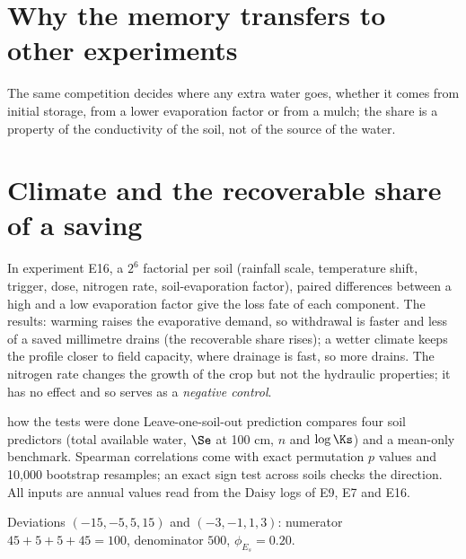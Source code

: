 


\section{Why the memory transfers to other experiments}
The same competition decides where any extra water goes, whether it comes from initial storage, from a lower evaporation factor or from a mulch; the share is a property of the conductivity of the soil, not of the source of the water.

\section{Climate and the recoverable share of a saving}
In experiment E16, a $2^6$ factorial per soil (rainfall scale, temperature shift, trigger, dose, nitrogen rate, soil-evaporation factor), paired differences between a high and a low evaporation factor give the loss fate of each component. The results: warming raises the evaporative demand, so withdrawal is faster and less of a saved millimetre drains (the recoverable share rises); a wetter climate keeps the profile closer to field capacity, where drainage is fast, so more drains. The nitrogen rate changes the growth of the crop but not the hydraulic properties; it has no effect and so serves as a \emph{negative control}.

\begin{daisybox}{how the tests were done}
Leave-one-soil-out prediction compares four soil predictors (total available water, $\Se$ at 100 cm, $n$ and $\log\Ks$) and a mean-only benchmark. Spearman correlations come with exact permutation $p$ values and 10,000 bootstrap resamples; an exact sign test across soils checks the direction. All inputs are annual values read from the Daisy logs of E9, E7 and E16.
\end{daisybox}

\sol  Deviations $(-15,-5,5,15)$ and $(-3,-1,1,3)$: numerator $45+5+5+45=100$, denominator $500$, $\phi_{E_s}=0.20$.

